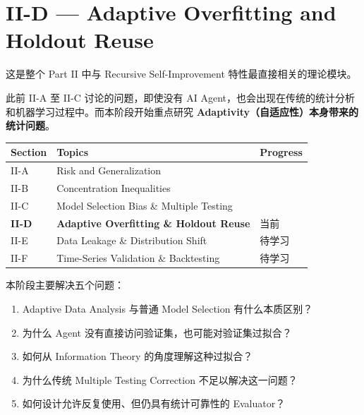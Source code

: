 \hypertarget{part-2-20-0001-ii-d-adaptive-overfitting-and-holdout-reuse}{%
\section{II-D --- Adaptive Overfitting and Holdout Reuse}\label{part-2-20-0001-ii-d-adaptive-overfitting-and-holdout-reuse}}

这是整个 Part II 中与 Recursive Self-Improvement 特性最直接相关的理论模块。

此前 II-A 至 II-C 讨论的问题，即使没有 AI Agent，也会出现在传统的统计分析和机器学习过程中。而本阶段开始重点研究 \textbf{Adaptivity（自适应性）本身带来的统计问题}。

\begin{readertable}
\begin{longtable}[]{@{}
  >{\raggedright\arraybackslash}p{}
  >{\raggedright\arraybackslash}p{}
  >{\raggedright\arraybackslash}p{}@{}}
\toprule
Section & Topics & Progress \\
\midrule
\endhead
II-A & Risk and Generalization & \\
II-B & Concentration Inequalities & \\
II-C & Model Selection Bias \& Multiple Testing & \\
\textbf{II-D} & \textbf{Adaptive Overfitting \& Holdout Reuse} & 当前 \\
II-E & Data Leakage \& Distribution Shift & 待学习 \\
II-F & Time-Series Validation \& Backtesting & 待学习 \\
\bottomrule
\end{longtable}
\end{readertable}

本阶段主要解决五个问题：

\begin{enumerate}
\def\labelenumi{\arabic{enumi}.}
\tightlist
\item
  Adaptive Data Analysis 与普通 Model Selection 有什么本质区别？
\item
  为什么 Agent 没有直接访问验证集，也可能对验证集过拟合？
\item
  如何从 Information Theory 的角度理解这种过拟合？
\item
  为什么传统 Multiple Testing Correction 不足以解决这一问题？
\item
  如何设计允许反复使用、但仍具有统计可靠性的 Evaluator？
\end{enumerate}

